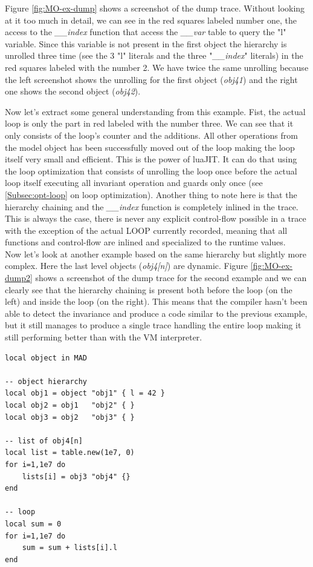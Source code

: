 Figure \ref{fig:MO-ex-dump} shows a screenshot of the dump trace. Without looking
at it too much in detail, we can see in the red squares labeled number one, the
access to the \emph{\_\_index} function that access the \emph{\_\_var} table to
query the "l" variable. Since this variable is not present in the first object
the hierarchy is unrolled three time (see the 3 "l" literals and the three
"\emph{\_\_index}" literals) in the red squares labeled with the number 2.
We have twice the same unrolling because the left screenshot shows the
unrolling for the first object (\emph{obj41}) and the right one shows the second
object (\emph{obj42}).

Now let's extract some general understanding from this example. Fist, the actual loop
is only the part in red labeled with the number three. We can see that it only
consists of the loop's counter and the additions. All other operations
from the model object has been successfully moved out of the loop making the loop
itself very small and efficient. This is the power of luaJIT. It can do that
using the loop optimization that consists of unrolling the loop once before the
actual loop itself executing all invariant operation and guards only once
(see \ref{Subsec:opt-loop} on loop optimization). Another thing to note here is
that the hierarchy chaining and the \emph{\_\_index} function is completely
inlined in the trace. This is always the case, there is never any explicit
control-flow possible in a trace with the exception of the actual LOOP currently
recorded, meaning that all functions and control-flow are inlined and specialized
to the runtime values.\\

Now let's look at another example based on the same hierarchy but slightly more
complex. Here the last level objects (\emph{obj4[n]}) are dynamic. Figure
\ref{fig:MO-ex-dump2} shows a screenshot of the dump trace for the second
example and we can clearly see that the hierarchy chaining is present both before
the loop (on the left) and inside the loop (on the right). This means that the
compiler hasn't been able to detect the invariance and produce a code similar to
the previous example, but it still manages to produce a single trace handling the
entire loop making it still performing better than with the VM interpreter.

\begin{lstlisting}[style=LuaStyle]
local object in MAD

-- object hierarchy
local obj1 = object "obj1" { l = 42 }
local obj2 = obj1   "obj2" { }
local obj3 = obj2   "obj3" { }

-- list of obj4[n]
local list = table.new(1e7, 0)
for i=1,1e7 do
	lists[i] = obj3 "obj4" {}
end

-- loop
local sum = 0
for i=1,1e7 do
	sum = sum + lists[i].l
end
\end{lstlisting}

